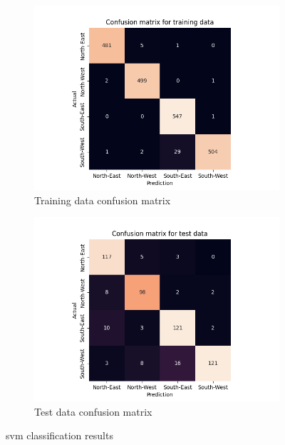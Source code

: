 \documentclass[10pt,twocolumn,letterpaper]{article}
\begin{document}
\begin{figure}
  \centering
  \begin{subfigure}{.33\linewidth}
    \includegraphics[width=\linewidth, trim={7em, 0em, 9em, 5em}, clip]{svm_cfsn_train}
    \caption{Training data confusion matrix}
    \label{fig:svm_train}
  \end{subfigure}
  \begin{subfigure}{0.33\linewidth}
    \includegraphics[width=\linewidth, trim={7em, 0em, 9em, 5em}, clip]{svm_cfsn_test}
    \caption{Test data confusion matrix}
    \label{fig:svm_test}
  \end{subfigure}
  \caption{\acrlong{svm} classification results}
  \label{fig:svm_res}
\end{figure}
\end{document}
